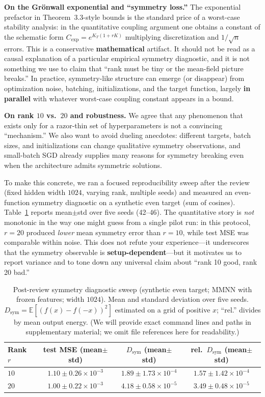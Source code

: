 \documentclass[11pt,a4paper]{article}
\begin{document}
\medskip
\noindent\textbf{On the Grönwall exponential and ``symmetry loss.''}
The exponential prefactor in Theorem~3.3-style bounds is the standard price of a worst-case stability analysis: in the quantitative coupling argument one obtains a constant of the schematic form $C_{\exp}=e^{K_T(1+rK)}$ multiplying discretization and $1/\sqrt{n}$ errors. This is a conservative \textbf{mathematical} artifact. It should not be read as a causal explanation of a particular empirical symmetry diagnostic, and it is not something we use to claim that ``rank must be tiny or the mean-field picture breaks.'' In practice, symmetry-like structure can emerge (or disappear) from optimization noise, batching, initializations, and the target function, largely \textbf{in parallel} with whatever worst-case coupling constant appears in a bound.

\medskip
\noindent\textbf{On rank $10$ vs.\ $20$ and robustness.}
We agree that any phenomenon that exists only for a razor-thin set of hyperparameters is not a convincing ``mechanism.'' We also want to avoid dueling anecdotes: different targets, batch sizes, and initializations can change qualitative symmetry observations, and small-batch SGD already supplies many reasons for symmetry breaking even when the architecture admits symmetric solutions.

To make this concrete, we ran a focused reproducibility sweep after the review (fixed hidden width $1024$, varying rank, multiple seeds) and measured an even-function symmetry diagnostic on a synthetic even target (sum of cosines). Table~\ref{tab:symmetry-rank-rebuttal} reports mean$\pm$std over five seeds (42--46). The quantitative story is \emph{not} monotonic in the way one might guess from a single pilot run: in this protocol, $r=20$ produced \emph{lower} mean symmetry error than $r=10$, while test MSE was comparable within noise. This does not refute your experience---it underscores that the symmetry observable is \textbf{setup-dependent}---but it motivates us to report variance and to tone down any universal claim about ``rank 10 good, rank 20 bad.''

\begin{table}[h]
\centering
\caption{Post-review symmetry diagnostic sweep (synthetic even target; MMNN with frozen features; width $1024$). Mean and standard deviation over five seeds. $D_{\mathrm{sym}}=\mathbb{E}[(f(x)-f(-x))^2]$ estimated on a grid of positive $x$; ``rel.'' divides by mean output energy. (We will provide exact command lines and paths in supplementary material; we omit file references here for readability.)}
\label{tab:symmetry-rank-rebuttal}
\begin{tabular}{lccc}
\toprule
Rank $r$ & test MSE (mean$\pm$std) & $D_{\mathrm{sym}}$ (mean$\pm$std) & rel.\ $D_{\mathrm{sym}}$ (mean$\pm$std) \\
\midrule
$10$ & $1.10{\pm}0.26\times 10^{-3}$ & $1.89{\pm}1.73\times 10^{-4}$ & $1.57{\pm}1.42\times 10^{-4}$ \\
$20$ & $1.00{\pm}0.22\times 10^{-3}$ & $4.18{\pm}0.58\times 10^{-5}$ & $3.49{\pm}0.48\times 10^{-5}$ \\
\bottomrule
\end{tabular}
\end{table}
\end{document}
